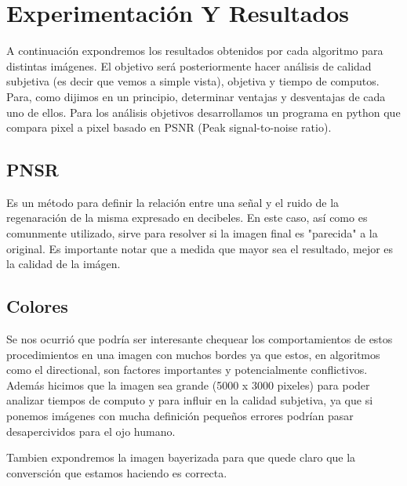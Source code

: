 \section{Experimentación Y Resultados}

A continuación expondremos los resultados obtenidos por cada algoritmo para distintas imágenes. El objetivo será posteriormente hacer análisis de calidad subjetiva (es decir que vemos a simple vista), objetiva y tiempo de computos. Para, como dijimos en un principio, determinar ventajas y desventajas de cada uno de ellos. Para los análisis objetivos desarrollamos un programa en python que compara pixel a pixel basado en PSNR (Peak signal-to-noise ratio). 

\subsection{PNSR}
Es un método para definir la relación entre una señal y el ruido de la regenaración de la misma expresado en decibeles. En este caso, así como es comunmente utilizado, sirve para resolver si la imagen final es "parecida" a la original. Es importante notar que a medida que mayor sea el resultado, mejor es la calidad de la imágen.

\subsection{Colores}


Se nos ocurrió que podría ser interesante chequear los comportamientos de estos procedimientos en una imagen con muchos bordes ya que estos, en algoritmos como el directional, son factores importantes y potencialmente conflictivos. Además hicimos que la imagen sea grande (5000 x 3000 pixeles) para poder analizar tiempos de computo y para influir en la calidad subjetiva, ya que si ponemos imágenes con mucha definición pequeños errores podrían pasar desapercividos para el ojo humano.

Tambien expondremos la imagen bayerizada para que quede claro que la conversción que estamos haciendo es correcta.

